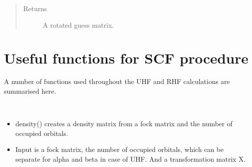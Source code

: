 \documentclass[letterpaper,10pt,english]{sphinxmanual}
\begin{document}
\begin{fulllineitems}
\begin{fulllineitems}
\begin{sphinxVerbatim}[commandchars=\\\{\}]
          
   
  
\end{sphinxVerbatim}
\begin{quote}\begin{description}
\item[{Returns}] \leavevmode
A rotated guess matrix.

\end{description}\end{quote}

\end{fulllineitems}


\end{fulllineitems}

\label{\detokenize{SCF_functions:module-ghf.SCF_functions}}

\chapter{Useful functions for SCF procedure}
\label{\detokenize{SCF_functions:useful-functions-for-scf-procedure}}\label{\detokenize{SCF_functions::doc}}
A number of functions used throughout the UHF and RHF calculations are summarised here.

\begin{fulllineitems}
\label{\detokenize{SCF_functions:ghf.SCF_functions.density_matrix}}~\begin{itemize}
\item {} 
density() creates a density matrix from a fock matrix and the number of occupied orbitals.

\item {} 
Input is a fock matrix, the number of occupied orbitals, which can be separate for alpha and beta in case of UHF.
And a transformation matrix X.

\end{itemize}

\end{fulllineitems}
\end{document}

